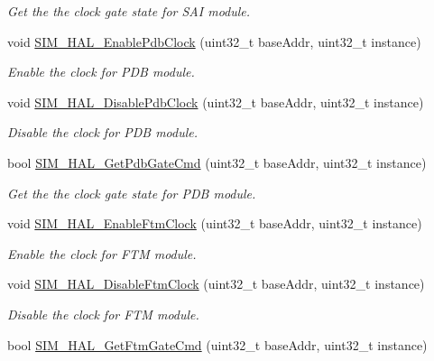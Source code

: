 \begin{DoxyCompactItemize}
\begin{DoxyCompactList}\small\item\em Get the the clock gate state for S\+AI module. \end{DoxyCompactList}\item 
void \hyperlink{group__sim__hal_gad22e2e70f01bdc314ded31c5a3049d78}{S\+I\+M\+\_\+\+H\+A\+L\+\_\+\+Enable\+Pdb\+Clock} (uint32\+\_\+t base\+Addr, uint32\+\_\+t instance)
\begin{DoxyCompactList}\small\item\em Enable the clock for P\+DB module. \end{DoxyCompactList}\item 
void \hyperlink{group__sim__hal_gab07a49b4a55909abc1857f921f44b679}{S\+I\+M\+\_\+\+H\+A\+L\+\_\+\+Disable\+Pdb\+Clock} (uint32\+\_\+t base\+Addr, uint32\+\_\+t instance)
\begin{DoxyCompactList}\small\item\em Disable the clock for P\+DB module. \end{DoxyCompactList}\item 
bool \hyperlink{group__sim__hal_gad6933326b0a18e562725f933488412ff}{S\+I\+M\+\_\+\+H\+A\+L\+\_\+\+Get\+Pdb\+Gate\+Cmd} (uint32\+\_\+t base\+Addr, uint32\+\_\+t instance)
\begin{DoxyCompactList}\small\item\em Get the the clock gate state for P\+DB module. \end{DoxyCompactList}\item 
void \hyperlink{group__sim__hal_gab0c8fe16fa484e7103a693ee61cc03af}{S\+I\+M\+\_\+\+H\+A\+L\+\_\+\+Enable\+Ftm\+Clock} (uint32\+\_\+t base\+Addr, uint32\+\_\+t instance)
\begin{DoxyCompactList}\small\item\em Enable the clock for F\+TM module. \end{DoxyCompactList}\item 
void \hyperlink{group__sim__hal_ga0e7e9382800ab71159d09ab52116b271}{S\+I\+M\+\_\+\+H\+A\+L\+\_\+\+Disable\+Ftm\+Clock} (uint32\+\_\+t base\+Addr, uint32\+\_\+t instance)
\begin{DoxyCompactList}\small\item\em Disable the clock for F\+TM module. \end{DoxyCompactList}\item 
bool \hyperlink{group__sim__hal_ga9adb87c48d3a6ad5d3881dd4c8ceb8b3}{S\+I\+M\+\_\+\+H\+A\+L\+\_\+\+Get\+Ftm\+Gate\+Cmd} (uint32\+\_\+t base\+Addr, uint32\+\_\+t instance)

\end{DoxyCompactItemize}

